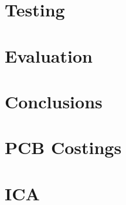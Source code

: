\documentclass[a4paper, 12pt]{report}
\begin{document}
\chapter{Testing}

\chapter{Evaluation}

\chapter{Conclusions}




\appendix
\chapter{PCB Costings}

\chapter{ICA}

\end{document}

